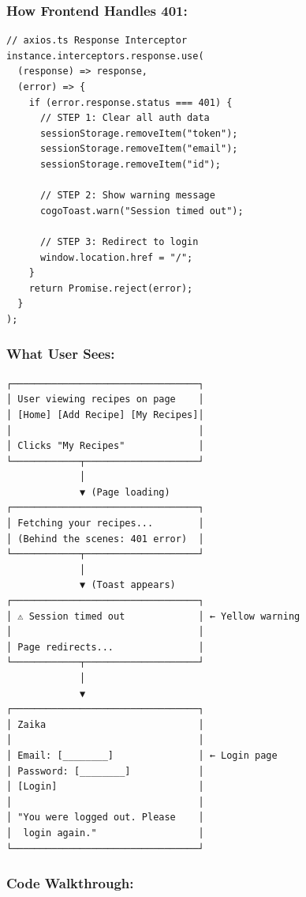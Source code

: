 \documentclass[12pt]{article}
\begin{document}
\subsubsection*{How Frontend Handles 401:}

\begin{lstlisting}
// axios.ts Response Interceptor
instance.interceptors.response.use(
  (response) => response,
  (error) => {
    if (error.response.status === 401) {
      // STEP 1: Clear all auth data
      sessionStorage.removeItem("token");
      sessionStorage.removeItem("email");
      sessionStorage.removeItem("id");
      
      // STEP 2: Show warning message
      cogoToast.warn("Session timed out");
      
      // STEP 3: Redirect to login
      window.location.href = "/";
    }
    return Promise.reject(error);
  }
);
\end{lstlisting}

\subsubsection*{What User Sees:}

\begin{lstlisting}
┌─────────────────────────────────┐
│ User viewing recipes on page    │
│ [Home] [Add Recipe] [My Recipes]│
│                                 │
│ Clicks "My Recipes"             │
└────────────┬────────────────────┘
             │
             ▼ (Page loading)
┌─────────────────────────────────┐
│ Fetching your recipes...        │
│ (Behind the scenes: 401 error)  │
└────────────┬────────────────────┘
             │
             ▼ (Toast appears)
┌─────────────────────────────────┐
│ ⚠ Session timed out             │ ← Yellow warning
│                                 │
│ Page redirects...               │
└────────────┬────────────────────┘
             │
             ▼
┌─────────────────────────────────┐
│ Zaika                           │
│                                 │
│ Email: [________]               │ ← Login page
│ Password: [________]            │
│ [Login]                         │
│                                 │
│ "You were logged out. Please    │
│  login again."                  │
└─────────────────────────────────┘
\end{lstlisting}

\subsubsection*{Code Walkthrough:}
\end{document}

